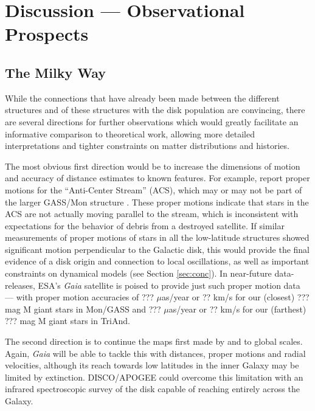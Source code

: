 \documentclass[galaxies,article,submit,moreauthors,pdftex,10pt,a4paper]{mdpi}
\begin{document}
\section{Discussion --- Observational Prospects}

\subsection{The Milky Way}

While the connections that have already been made between the different structures and of these structures with the disk population are convincing, there are several directions for further observations which would greatly facilitate an informative comparison to theoretical work, allowing more detailed interpretations and tighter constraints on matter distributions and histories.

The most obvious first direction would be to increase the dimensions of motion and accuracy of distance estimates to known features.
For example, \cite{carlin10} report proper motions for the ``Anti-Center Stream'' (ACS), which may or may not be part of the larger GASS/Mon structure \citep[it is at the right distance but is morphologically distinct, see][]{li12}.
These proper motions indicate that stars in the ACS are not actually moving parallel to the stream, which is inconsistent with expectations for the behavior of debris from a destroyed satellite.
If similar measurements of proper motions of stars in all the low-latitude structures showed significant motion perpendicular to the Galactic disk, this would provide the final evidence of a disk origin and connection to local oscillations, as well as important constraints on dynamical models (see Section \ref{sec:conc}).
In near-future data-releases, ESA's {\it Gaia} satellite \cite{} is poised to provide just such proper motion data --- with proper motion accuracies of ??? $\mu$as/year or ?? km/s for our (closest) ??? mag M giant stars in Mon/GASS and ??? $\mu$as/year or ?? km/s for our (farthest) ??? mag M giant stars in TriAnd.

The second direction is to continue the maps first made by \cite{xi15} and \cite{lurie17} to global scales. Again, {\it Gaia} will be able to tackle this with distances, proper motions and radial velocities, although its reach towards low latitudes in the inner Galaxy may be limited by extinction.
DISCO/APOGEE could overcome this limitation with an infrared spectroscopic survey of the disk capable of reaching entirely across the Galaxy.
\end{document}

